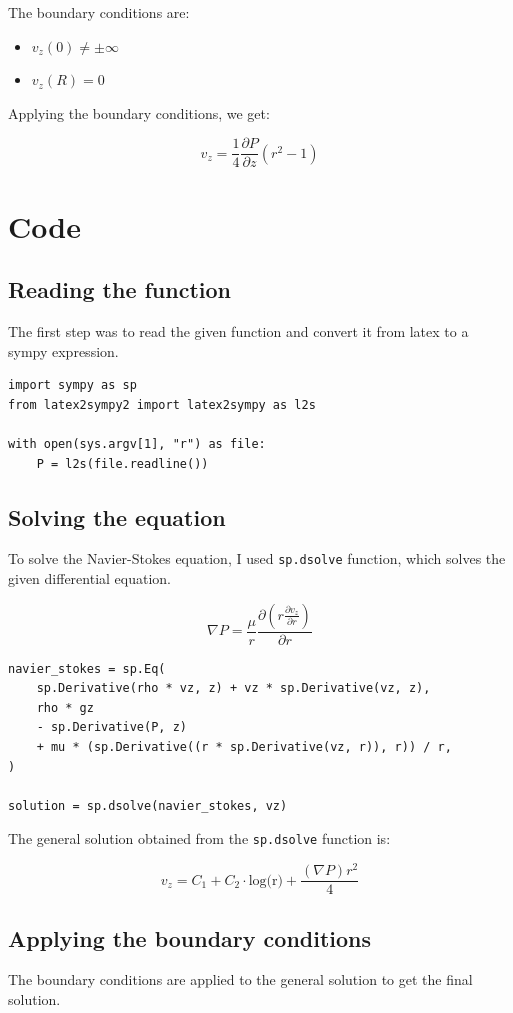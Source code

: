 \documentclass[12pt]{report}
\begin{document}
The boundary conditions are:

\begin{itemize}
    \item $v_z(0) \neq \pm \infty$
    \item $v_z(R) = 0$
\end{itemize}

Applying the boundary conditions, we get:

$$v_z = \frac{1}{4}\frac{\partial P}{\partial z}(r^2 - 1)$$

\section{Code}

\subsection{Reading the function}
The first step was to read the given function and convert it from latex to a sympy expression.

\begin{lstlisting}[caption={Reading the function}]
import sympy as sp
from latex2sympy2 import latex2sympy as l2s

with open(sys.argv[1], "r") as file:
    P = l2s(file.readline())
\end{lstlisting}

\subsection{Solving the equation}
To solve the Navier-Stokes equation, I used \texttt{sp.dsolve} function, which solves the given differential equation.

$$\nabla P = \frac{\mu}{r}\frac{\partial(r \frac{\partial v_z}{\partial r})}{\partial r}$$

\begin{lstlisting}[caption={Solving the equation}]
navier_stokes = sp.Eq(
    sp.Derivative(rho * vz, z) + vz * sp.Derivative(vz, z),
    rho * gz
    - sp.Derivative(P, z)
    + mu * (sp.Derivative((r * sp.Derivative(vz, r)), r)) / r,
)

solution = sp.dsolve(navier_stokes, vz)
\end{lstlisting}
The general solution obtained from the \texttt{sp.dsolve} function is:

$$v_z = C_1 + C_2\cdot \text{log(r)} + \frac{(\nabla P) r^2}{4}$$

\subsection{Applying the boundary conditions}
The boundary conditions are applied to the general solution to get the final solution.
\end{document}
